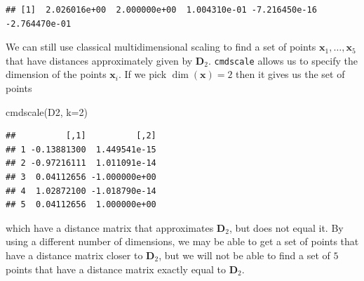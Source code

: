 \documentclass[
]{book}
\newenvironment{Shaded}{\begin{snugshade}}{\end{snugshade}}
\newcommand{\AttributeTok}[1]{\textcolor[rgb]{0.77,0.63,0.00}{#1}}
\newcommand{\DecValTok}[1]{\textcolor[rgb]{0.00,0.00,0.81}{#1}}
\newcommand{\FloatTok}[1]{\textcolor[rgb]{0.00,0.00,0.81}{#1}}
\newcommand{\FunctionTok}[1]{\textcolor[rgb]{0.00,0.00,0.00}{#1}}
\newcommand{\NormalTok}[1]{#1}
\newcommand{\OtherTok}[1]{\textcolor[rgb]{0.56,0.35,0.01}{#1}}
\newcommand{\SpecialCharTok}[1]{\textcolor[rgb]{0.00,0.00,0.00}{#1}}
\theoremstyle{definition}
\theoremstyle{definition}
\theoremstyle{definition}
\theoremstyle{definition}
\theoremstyle{remark}
\begin{document}
\begin{Shaded}
\end{Shaded}

\begin{verbatim}
## [1]  2.026016e+00  2.000000e+00  1.004310e-01 -7.216450e-16 -2.764470e-01
\end{verbatim}

We can still use classical multidimensional scaling to find a set of points \(\mathbf x_1, \ldots, \mathbf x_5\) that have distances approximately given by \(\mathbf D_2\).
\texttt{cmdscale} allows us to specify the dimension of the points \(\mathbf x_i\). If we pick \(\dim(\mathbf x)=2\) then it gives us the set of points

\begin{Shaded}
\begin{Highlighting}[]
\FunctionTok{cmdscale}\NormalTok{(D2, }\AttributeTok{k=}\DecValTok{2}\NormalTok{)}
\end{Highlighting}
\end{Shaded}

\begin{verbatim}
##          [,1]          [,2]
## 1 -0.13881300  1.449541e-15
## 2 -0.97216111  1.011091e-14
## 3  0.04112656 -1.000000e+00
## 4  1.02872100 -1.018790e-14
## 5  0.04112656  1.000000e+00
\end{verbatim}

which have a distance matrix that approximates \(\mathbf D_2\), but does not equal it. By using a different number of dimensions, we may be able to get a set of points that have a distance matrix closer to \(\mathbf D_2\), but we will not be able to find a set of \(5\) points that have a distance matrix exactly equal to \(\mathbf D_2\).
\end{document}
